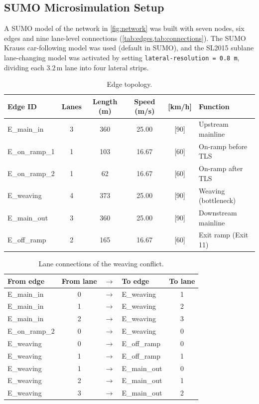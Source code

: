 \documentclass[11pt,a4paper]{article}
\begin{document}
\subsection{SUMO Microsimulation Setup}
\label{sec:sumo}
A SUMO model of the network in \cref{fig:network} was built with seven nodes, six edges and nine lane-level connections (\cref{tab:edges,tab:connections}). The SUMO Krauss car-following model was used (default in SUMO), and the SL2015 sublane lane-changing model was activated by setting \texttt{lateral-resolution = 0.8\,m}, dividing each $3.2$\,m lane into four lateral strips.

\begin{table}[H]
\centering
\caption{Edge topology.}
\label{tab:edges}
\begin{tabular}{l c c c c l}
\toprule
\textbf{Edge ID} & \textbf{Lanes} & \textbf{Length (m)} & \textbf{Speed (m/s)} & \textbf{[km/h]} & \textbf{Function} \\ \midrule
E\_main\_in    & 3 & 360 & 25.00 & [90] & Upstream mainline \\
E\_on\_ramp\_1 & 1 & 103 & 16.67 & [60] & On-ramp before TLS \\
E\_on\_ramp\_2 & 1 & 62  & 16.67 & [60] & On-ramp after TLS \\
E\_weaving     & 4 & 373 & 25.00 & [90] & Weaving (bottleneck) \\
E\_main\_out   & 3 & 360 & 25.00 & [90] & Downstream mainline \\
E\_off\_ramp   & 2 & 165 & 16.67 & [60] & Exit ramp (Exit 11) \\
\bottomrule
\end{tabular}
\end{table}

\begin{table}[H]
\centering
\caption{Lane connections of the weaving conflict.}
\label{tab:connections}
\begin{tabular}{lc c lc}
\toprule
\textbf{From edge} & \textbf{From lane} & \textbf{$\rightarrow$} & \textbf{To edge} & \textbf{To lane} \\ \midrule
E\_main\_in   & 0 & $\rightarrow$ & E\_weaving   & 1 \\
E\_main\_in   & 1 & $\rightarrow$ & E\_weaving   & 2 \\
E\_main\_in   & 2 & $\rightarrow$ & E\_weaving   & 3 \\
E\_on\_ramp\_2& 0 & $\rightarrow$ & E\_weaving   & 0 \\
E\_weaving    & 0 & $\rightarrow$ & E\_off\_ramp & 0 \\
E\_weaving    & 1 & $\rightarrow$ & E\_off\_ramp & 1 \\
E\_weaving    & 1 & $\rightarrow$ & E\_main\_out & 0 \\
E\_weaving    & 2 & $\rightarrow$ & E\_main\_out & 1 \\
E\_weaving    & 3 & $\rightarrow$ & E\_main\_out & 2 \\
\bottomrule
\end{tabular}
\end{table}
\end{document}
